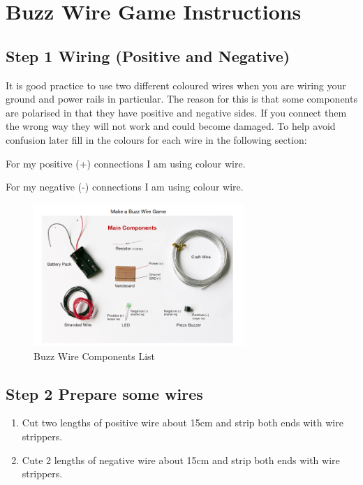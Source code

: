 \newpage
\chapter*{Buzz Wire Game Instructions}

%
\section*{Step 1 Wiring (Positive and Negative)}

It is good practice to use two different coloured wires when you are wiring your ground and power rails in particular. The reason for this is that some components are polarised in that they have positive and negative sides. If you connect them the wrong way they will not work and could become damaged. To help avoid confusion later fill in the colours for each wire in the following section:

For my positive (+) connections I am using \makebox[3cm]{\hrulefill} colour wire.


For my negative (-) connections I am using \makebox[3cm]{\hrulefill} colour wire.


%
\begin{figure}[ht]
	\centering
	\includegraphics[width=8cm]{images/component_list}
	\caption{Buzz Wire Components List}
	\label{fig:components_list}
\end{figure}
%

\section*{Step 2 Prepare some wires}

\begin{enumerate}
	\item Cut two lengths of positive wire about 15cm and strip both ends with wire strippers.
	
	\item Cute 2 lengths of negative wire about 15cm and strip both ends with wire strippers.
\end{enumerate}

